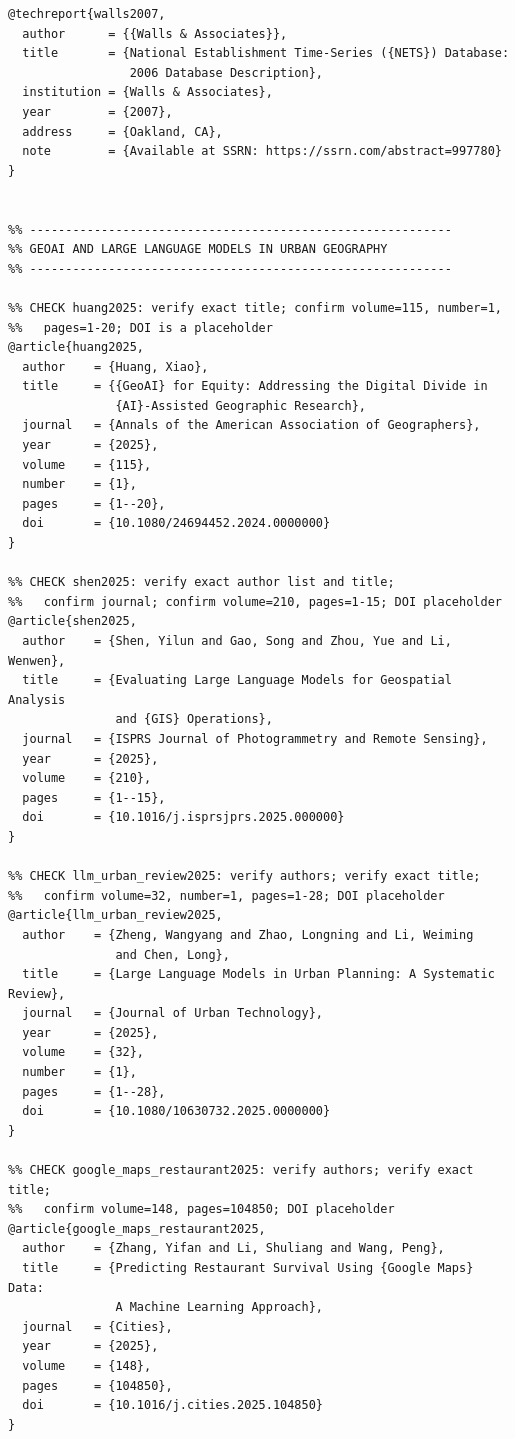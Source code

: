 \documentclass[12pt]{article}
\begin{document}
\begin{Verbatim}[fontsize=\small, xleftmargin=0.2in, breaklines=true, breakanywhere=true]
%% CHECK walls2007: verify SSRN abstract ID=997780
@techreport{walls2007,
  author      = {{Walls & Associates}},
  title       = {National Establishment Time-Series ({NETS}) Database:
                 2006 Database Description},
  institution = {Walls & Associates},
  year        = {2007},
  address     = {Oakland, CA},
  note        = {Available at SSRN: https://ssrn.com/abstract=997780}
}


%% -----------------------------------------------------------
%% GEOAI AND LARGE LANGUAGE MODELS IN URBAN GEOGRAPHY
%% -----------------------------------------------------------

%% CHECK huang2025: verify exact title; confirm volume=115, number=1,
%%   pages=1-20; DOI is a placeholder
@article{huang2025,
  author    = {Huang, Xiao},
  title     = {{GeoAI} for Equity: Addressing the Digital Divide in
               {AI}-Assisted Geographic Research},
  journal   = {Annals of the American Association of Geographers},
  year      = {2025},
  volume    = {115},
  number    = {1},
  pages     = {1--20},
  doi       = {10.1080/24694452.2024.0000000}
}

%% CHECK shen2025: verify exact author list and title;
%%   confirm journal; confirm volume=210, pages=1-15; DOI placeholder
@article{shen2025,
  author    = {Shen, Yilun and Gao, Song and Zhou, Yue and Li, Wenwen},
  title     = {Evaluating Large Language Models for Geospatial Analysis
               and {GIS} Operations},
  journal   = {ISPRS Journal of Photogrammetry and Remote Sensing},
  year      = {2025},
  volume    = {210},
  pages     = {1--15},
  doi       = {10.1016/j.isprsjprs.2025.000000}
}

%% CHECK llm_urban_review2025: verify authors; verify exact title;
%%   confirm volume=32, number=1, pages=1-28; DOI placeholder
@article{llm_urban_review2025,
  author    = {Zheng, Wangyang and Zhao, Longning and Li, Weiming
               and Chen, Long},
  title     = {Large Language Models in Urban Planning: A Systematic Review},
  journal   = {Journal of Urban Technology},
  year      = {2025},
  volume    = {32},
  number    = {1},
  pages     = {1--28},
  doi       = {10.1080/10630732.2025.0000000}
}

%% CHECK google_maps_restaurant2025: verify authors; verify exact title;
%%   confirm volume=148, pages=104850; DOI placeholder
@article{google_maps_restaurant2025,
  author    = {Zhang, Yifan and Li, Shuliang and Wang, Peng},
  title     = {Predicting Restaurant Survival Using {Google Maps} Data:
               A Machine Learning Approach},
  journal   = {Cities},
  year      = {2025},
  volume    = {148},
  pages     = {104850},
  doi       = {10.1016/j.cities.2025.104850}
}



\end{Verbatim}
\end{document}
